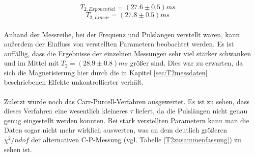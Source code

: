 \documentclass[12pt,a4paper]{article}
\begin{document}
\begin{equation*}
\boxed{T_{2, Exponential} = (27.6\pm 0.5)ms}
\end{equation*}
\begin{equation*}
\boxed{T_{2, Linear} = (27.8\pm 0.5)ms}
\end{equation*}\\

Anhand der Messreihe, bei der Frequenz und Pulslängen verstellt waren, kann außerdem der Einfluss von verstellten Parametern beobachtet werden. Es ist auffällig, dass die Ergebnisse der einzelnen Messungen sehr viel stärker schwanken und im Mittel mit $T_2 = (28.9\pm0.8)ms$ größer sind. Dies war zu erwarten, da sich die Magnetisierung hier durch die in Kapitel \ref{sec:T2messdaten} beschriebenen Effekte unkontrollierter verhält.\\
\\
Zuletzt wurde noch das Carr-Purcell-Verfahren ausgewertet. Es ist zu sehen, dass dieses Verfahren eine wesentlich kleineres $\tau$ liefert, da die Pulslängen nicht genau genug eingestellt werden konnten. Bei stark verstellten Parametern kann man die Daten sogar nicht mehr wirklich auswerten, was an dem deutlich größeren $\chi^2/ndof$ der alternativen C-P-Messung (vgl. Tabelle \ref{T2zusammenfassung}) zu sehen ist.
\end{document}
